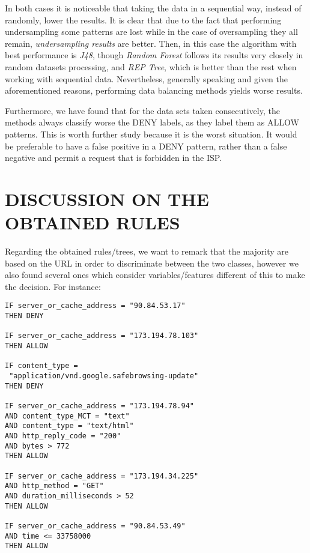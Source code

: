 \documentclass{llncs}
\begin{document}
In both cases it is noticeable that taking the data in a sequential way, instead of randomly, lower the results. It is clear that due to the fact that performing undersampling some patterns are lost while in the case of oversampling they all remain, \textit{undersampling results} are better. Then, in this case the algorithm with best performance is \textit{J48}, though \textit{Random Forest} follows its results very closely in random datasets processing, and \textit{REP Tree}, which is better than the rest when working with sequential data. Nevertheless, generally speaking and given the aforementioned reasons, performing data balancing methods yields worse results.

Furthermore, we have found that for the data sets taken consecutively, the methods always classify worse the DENY labels, as they label them as ALLOW patterns. This is worth further study because it is the worst situation. It would be preferable to have a false positive in a DENY pattern, rather than a false negative and permit a request that is forbidden in the ISP.

%
\section{\uppercase{Discussion on the Obtained Rules}}
\label{sec:rulesdiscussion}

Regarding the obtained rules/trees, we want to remark that the majority are based on the URL in order to discriminate between the two classes, however we also found several ones which consider variables/features different of this to make the decision. For instance:\\

\begin{verbatim}
IF server_or_cache_address = "90.84.53.17" 
THEN DENY

IF server_or_cache_address = "173.194.78.103" 
THEN ALLOW

IF content_type = 
 "application/vnd.google.safebrowsing-update" 
THEN DENY

IF server_or_cache_address = "173.194.78.94" 
AND content_type_MCT = "text"
AND content_type = "text/html"
AND http_reply_code = "200"
AND bytes > 772
THEN ALLOW

IF server_or_cache_address = "173.194.34.225"
AND http_method = "GET"
AND duration_milliseconds > 52
THEN ALLOW

IF server_or_cache_address = "90.84.53.49"
AND time <= 33758000
THEN ALLOW
\end{verbatim}
\end{document}
